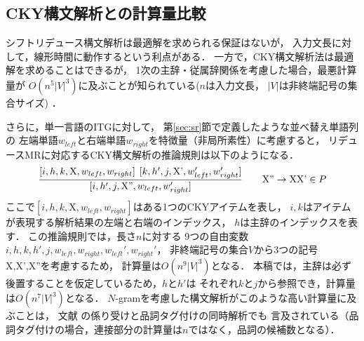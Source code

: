 \documentclass[japanese]{jnlp_1.4}
\begin{document}
\subsection{CKY構文解析との計算量比較}

シフトリデュース構文解析は最適解を求められる保証はないが，
入力文長に対して，線形時間に動作するという利点がある．
一方で，CKY構文解析法は最適解を求めることはできるが，
1次の主辞・従属辞関係を考慮した場合，最悪計算量が
$O(n^5|V|^3)$に及ぶことが知られている($n$は入力文長，
$|V|$は非終端記号の集合サイズ) \cite{Eisner:99}．

さらに，単一言語のITGに対して，
第\ref{sec:sr}節で定義したような並べ替え単語列の
左端単語$w_{left}$と右端単語$w_{right}$を特徴量（非局所素性）に考慮すると，
リデュースMRに対応するCKY構文解析の推論規則は以下のようになる．
\[
\frac{[i,h,k,\text{X},w_{left},w_{right}]\hspace{1.5mm}
[k,h',j,\text{X'},w_{left}',w_{right}']}{[i,h',j,
\text{X''},w_{left},w_{right}']}
\qquad
\text{X''}\rightarrow\text{X}\text{X'}\in P
\]
ここで$[i,h,k,\text{X},w_{left},w_{right}]$はある1つのCKYアイテムを表し，
$i,k$はアイテムが表現する解析結果の左端と右端のインデックス，
$h$は主辞のインデックスを表す．
この推論規則では，長さ$n$に対する
9つの自由変数$i,h,k,h',j,w_{left},w_{right},w_{left}',w_{right}'$，
非終端記号の集合$V$から3つの記号X,X',X''を考慮するため，
計算量は$O(n^9|V|^3)$となる．
本稿では，主辞は必ず後置することを仮定しているため，$h$と$h'$は
それぞれ$k$と$j$から参照でき，計算量は$O(n^7|V|^3)$となる．
$N$-gramを考慮した構文解析がこのような高い計算量に及ぶことは，
文献 \cite{Z-Li:11}の係り受けと品詞タグ付けの同時解析でも
言及されている（品詞タグ付けの場合，連接部分の計算量は$n$ではなく，品詞の候補数となる）．
\end{document}
